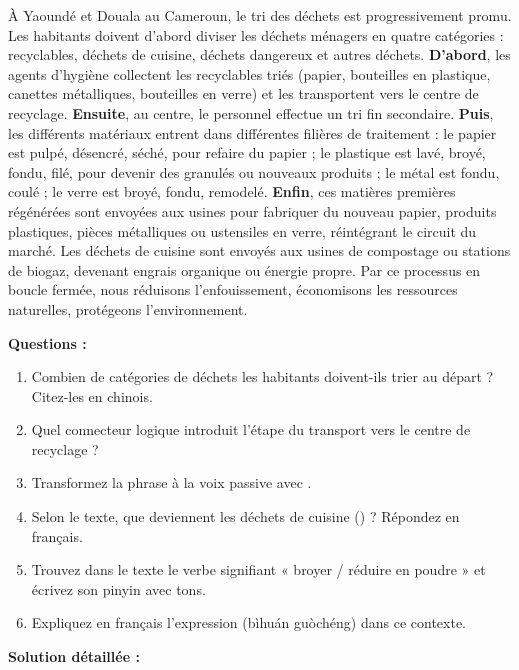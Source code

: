 \documentclass[11pt]{article}
\newcommand{\zh}[1]{\ifmmode\text{#1}\else{#1}\fi}
\begin{document}
\begin{exoresolu}
\begin{textebox}
À Yaoundé et Douala au Cameroun, le tri des déchets est progressivement promu. Les habitants doivent d'abord diviser les déchets ménagers en quatre catégories : recyclables, déchets de cuisine, déchets dangereux et autres déchets. \textbf{D'abord}, les agents d'hygiène collectent les recyclables triés (papier, bouteilles en plastique, canettes métalliques, bouteilles en verre) et les transportent vers le centre de recyclage. \textbf{Ensuite}, au centre, le personnel effectue un tri fin secondaire. \textbf{Puis}, les différents matériaux entrent dans différentes filières de traitement : le papier est pulpé, désencré, séché, pour refaire du papier ; le plastique est lavé, broyé, fondu, filé, pour devenir des granulés ou nouveaux produits ; le métal est fondu, coulé ; le verre est broyé, fondu, remodelé. \textbf{Enfin}, ces matières premières régénérées sont envoyées aux usines pour fabriquer du nouveau papier, produits plastiques, pièces métalliques ou ustensiles en verre, réintégrant le circuit du marché. Les déchets de cuisine sont envoyés aux usines de compostage ou stations de biogaz, devenant engrais organique ou énergie propre. Par ce processus en boucle fermée, nous réduisons l'enfouissement, économisons les ressources naturelles, protégeons l'environnement.
\end{textebox}

\textbf{Questions :}
\begin{enumerate}
    \item Combien de catégories de déchets les habitants doivent-ils trier au départ ? Citez-les en chinois.
    \item Quel connecteur logique introduit l'étape du transport vers le centre de recyclage ?
    \item Transformez la phrase \zh{工人把塑料瓶粉碎} à la voix passive avec \zh{被}.
    \item Selon le texte, que deviennent les déchets de cuisine (\zh{厨余垃圾}) ? Répondez en français.
    \item Trouvez dans le texte le verbe signifiant « broyer / réduire en poudre » et écrivez son pinyin avec tons.
    \item Expliquez en français l'expression \zh{闭环过程} (bìhuán guòchéng) dans ce contexte.
\end{enumerate}

\tcblower

\textbf{Solution détaillée :}


\end{exoresolu}
\end{document}
